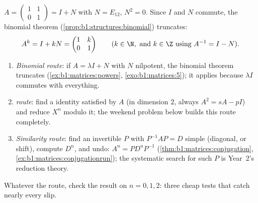 \begin{example}\label{ex:b1:matrices:powers}
$A = \begin{pmatrix} 1 & 1 \\ 0 & 1\end{pmatrix} = I + N$ with $N =
E_{12}$, $N^2 = 0$. Since $I$ and $N$ commute, the binomial theorem
(\cref{prop:b1:structures:binomial}) truncates:
\[
A^k = I + kN = \begin{pmatrix} 1 & k \\ 0 & 1 \end{pmatrix}
\qquad (k \in \N, \text{ and } k \in \Z \text{ using } A^{-1} = I -
N).
\]
\end{example}

\begin{method}
\label{met:b1:matrices:powers}
\begin{enumerate}
  \item \emph{Binomial route}: if $A = \lambda I + N$ with $N$
        nilpotent, the binomial theorem truncates
        (\cref{ex:b1:matrices:powers}, \cref{exo:b1:matrices:5});
        it applies because $\lambda I$ commutes with everything.
  \item \emph{ route}: find a  identity
        satisfied by $A$ (in dimension $2$, always $A^2 = sA -
        pI$) and reduce $X^n$ modulo it; the weekend problem
        below builds this route completely.
  \item \emph{Similarity route}: find an invertible $P$ with
        $P^{-1}AP = D$ simple (diagonal, or shift), compute
        $D^n$, and undo: $A^n = P D^n P^{-1}$
        (\cref{thm:b1:matrices:conjugation},
        \cref{ex:b1:matrices:conjugationrun}); the systematic
        search for such $P$ is Year~2's reduction theory.
\end{enumerate}
Whatever the route, check the result on $n = 0, 1, 2$: three
cheap tests that catch nearly every slip.
\end{method}

